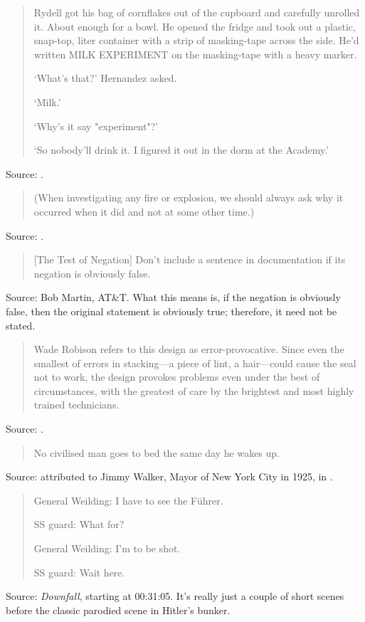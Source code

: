 \documentclass[a4paper]{article}
\begin{document}
\begin{quote}
Rydell got his bag of cornflakes out of the cupboard and carefully unrolled it. About enough
for a bowl. He opened the fridge and took out a plastic, snap-top, liter container with a strip of
masking-tape across the side. He'd written MILK EXPERIMENT on the masking-tape with a heavy marker.

`What's that?' Hernandez asked.

`Milk.'

`Why's it say "experiment"?'

`So nobody'll drink it. I figured it out in the dorm at the Academy.'
\end{quote}
Source: \citet[pp.~75--6]{Gibson1993}.
\medskip

\begin{quote}
	(When investigating any fire or explosion, we should always ask why it occurred when it did and
not at some other time.)
\end{quote}
Source: \citet[p.~134]{Kletz2003}.
\medskip

\begin{quote}
	[The Test of Negation] Don't include a sentence in documentation if its negation is obviously
	false.
\end{quote}
Source: Bob Martin, AT\&T.  What this means is, if the negation is obviously false, then the
original statement is obviously true; therefore, it need not be stated.
\medskip

\begin{quote}
	Wade Robison refers to this design as error-provocative.  Since even the smallest of errors
	in stacking---a piece of lint, a hair---could cause the seal not to work, the design provokes
	problems even under the best of circumstances, with the greatest of care by the brightest and
	most highly trained technicians.
\end{quote}
Source: \citet[p.~61n]{Robison2002}.
\medskip

\begin{quote}
	No civilised man goes to bed the same day he wakes up.
\end{quote}
Source: attributed to Jimmy Walker, Mayor of New York City in 1925, in \citet[p.~474]{Dunford2002}.
\medskip

\begin{quote}
	General Weilding: I have to see the F\"uhrer.

	SS guard: What for?

	General Weilding: I'm to be shot.

	SS guard: Wait here.
\end{quote}
Source: \emph{Downfall}, starting at 00:31:05.  It's really just a couple of short scenes before
the classic parodied scene in Hitler's bunker.
\medskip
\end{document}
